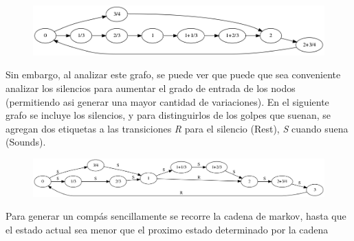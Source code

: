 \begin{figure}[h]
\begin{center}
\includegraphics[width=12cm]{rythm_markov/images/grafo_sin_etiquetas.png}
\label{fig:grafo_sin_etiquetas}
\end{center}
\end{figure}

Sin embargo, al analizar este grafo, se puede ver que puede que sea conveniente analizar los silencios para aumentar el grado de entrada de los nodos
(permitiendo asi generar una mayor cantidad de variaciones). En el siguiente grafo se incluye los silencios, y para distinguirlos de los golpes que 
suenan, se agregan dos etiquetas a las transiciones \emph{R} para el silencio (Rest), \emph{S} cuando suena (Sounds).

\begin{figure}[h]
\begin{center}
\includegraphics[width=12cm]{rythm_markov/images/grafo_con_etiquetas.png}
\label{fig:grafo_con_etiquetas}
\end{center}
\end{figure}

Para generar un comp\'as sencillamente se recorre la cadena de markov, hasta que el estado actual sea menor que el proximo estado determinado por la cadena


